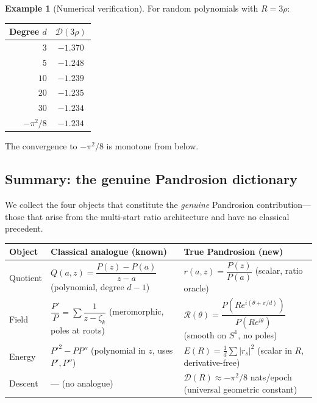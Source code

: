 \documentclass[10pt,a4paper,oneside]{book}
\theoremstyle{definition}
\newtheorem{example}[theorem]{Example}
\theoremstyle{remark}
\begin{document}
\begin{example}[Numerical verification]
For random polynomials with $R = 3\rho$:
\begin{center}
\renewcommand{\arraystretch}{1.2}
\begin{tabular}{rc}
\toprule
Degree $d$ & $\mathcal{D}(3\rho)$ \\
\midrule
$3$ & $-1.370$ \\
$5$ & $-1.248$ \\
$10$ & $-1.239$ \\
$20$ & $-1.235$ \\
$30$ & $-1.234$ \\
$-\pi^2/8$ & $-1.234$ \\
\bottomrule
\end{tabular}
\end{center}
The convergence to $-\pi^2/8$ is monotone from below.
\end{example}

\subsection{Summary: the genuine Pandrosion dictionary}
\label{sec:genuine_dictionary}

We collect the four objects that constitute the \emph{genuine} Pandrosion contribution---those that arise from the multi-start ratio architecture and have no classical precedent.

\begin{center}
\renewcommand{\arraystretch}{1.5}
\begin{tabular}{p{2.8cm}p{4.8cm}p{5.5cm}}
\toprule
\textbf{Object} & \textbf{Classical analogue (known)} & \textbf{True Pandrosion (new)} \\
\midrule
Quotient & $Q(a,z) = \dfrac{P(z)-P(a)}{z-a}$ \newline (polynomial, degree $d{-}1$) & $r(a,z) = \dfrac{P(z)}{P(a)}$ \newline (scalar, ratio oracle) \\
\midrule
Field & $\dfrac{P'}{P} = \sum\dfrac{1}{z-\zeta_k}$ \newline (meromorphic, poles at roots) & $\mathcal{R}(\theta) = \dfrac{P(Re^{i(\theta+\pi/d)})}{P(Re^{i\theta})}$ \newline (smooth on $S^1$, no poles) \\
\midrule
Energy & $P'^2 - PP''$ \newline (polynomial in $z$, uses $P', P''$) & $E(R) = \frac{1}{d}\sum|r_s|^2$ \newline (scalar in $R$, derivative-free) \\
\midrule
Descent & --- (no analogue) & $\mathcal{D}(R) \approx -\pi^2/8$ nats/epoch \newline (universal geometric constant) \\
\bottomrule
\end{tabular}
\end{center}
\end{document}
